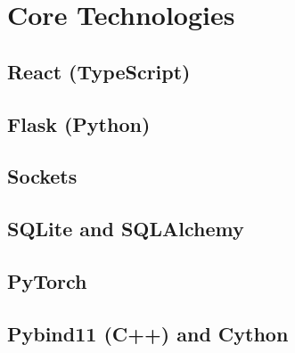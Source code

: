 
\chapter{Core Technologies}
\section{React (TypeScript)}
\section{Flask (Python)}
\section{Sockets}
\section{SQLite and SQLAlchemy}
\section{PyTorch}
\section{Pybind11 (C++) and Cython}